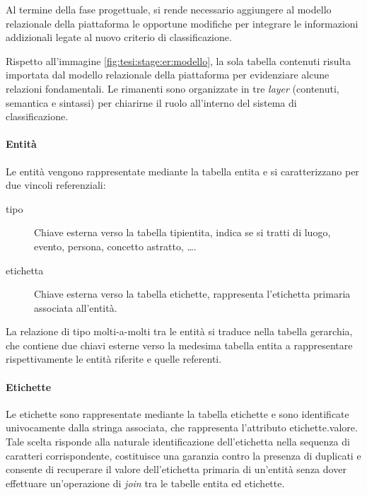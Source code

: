 Al termine della fase progettuale, si rende necessario aggiungere al modello relazionale della piattaforma le opportune modifiche per integrare le informazioni addizionali legate al nuovo criterio di classificazione.

Rispetto all'immagine \ref{fig:tesi:stage:er:modello}, la sola tabella \textsf{contenuti} risulta importata dal modello relazionale della piattaforma per evidenziare alcune relazioni fondamentali. Le rimanenti sono organizzate in tre \textit{layer} (\textsf{contenuti}, \textsf{semantica} e \textsf{sintassi}) per chiarirne il ruolo all'interno del sistema di classificazione.

\paragraph{Entità}
Le entità vengono rappresentate mediante la tabella \textsf{entita} e si caratterizzano per due vincoli referenziali:
\begin{description}
\item[tipo] 
Chiave esterna verso la tabella \textsf{tipi\textunderscore entita}, indica se si tratti di luogo, evento, persona, concetto astratto, \ldots. 
\item[etichetta]
Chiave esterna verso la tabella \textsf{etichette}, rappresenta l'etichetta primaria associata all'entità.
\end{description}

La relazione di tipo molti-a-molti tra le entità si traduce nella tabella \textsf{gerarchia}, che contiene due chiavi esterne verso la medesima tabella \textsf{entita} a rappresentare rispettivamente le entità riferite e quelle referenti.

\paragraph{Etichette}
Le etichette sono rappresentate mediante la tabella \textsf{etichette} e sono identificate univocamente dalla stringa associata, che rappresenta l'attributo \textsf{etichette.valore}. Tale scelta risponde alla naturale identificazione dell'etichetta nella sequenza di caratteri corrispondente, costituisce una garanzia contro la presenza di duplicati e consente di recuperare il valore dell'etichetta primaria di un'entità senza dover effettuare un'operazione di \textit{join} tra le tabelle \textsf{entita} ed \textsf{etichette}.

